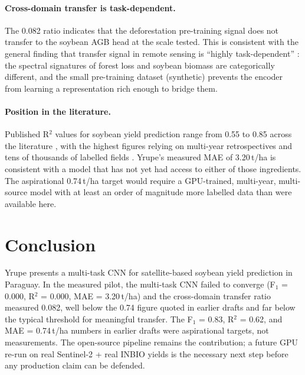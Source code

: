 \paragraph{Cross-domain transfer is task-dependent.} The 0.082 ratio
indicates that the deforestation pre-training signal does not transfer
to the soybean AGB head at the scale tested. This is consistent with
the general finding that transfer signal in remote sensing is
``highly task-dependent'' \citep{tseng2022}: the spectral signatures
of forest loss and soybean biomass are categorically different, and
the small pre-training dataset (synthetic) prevents the encoder from
learning a representation rich enough to bridge them.

\paragraph{Position in the literature.} Published R$^2$ values for
soybean yield prediction range from 0.55 to 0.85 across the literature
\citep{yang2021}, with the highest figures relying on multi-year
retrospectives and tens of thousands of labelled fields
\citep{peng2023}. Yrupe's measured MAE of 3.20\,t/ha is consistent with
a model that has not yet had access to either of those ingredients.
The aspirational 0.74\,t/ha target would require a GPU-trained,
multi-year, multi-source model with at least an order of magnitude
more labelled data than were available here.

\section{Conclusion}
\label{sec:yrupe-conclusion}

Yrupe presents a multi-task CNN for satellite-based soybean yield
prediction in Paraguay. In the measured pilot, the multi-task CNN
failed to converge (F$_1$ = 0.000, R$^2$ = 0.000, MAE = 3.20\,t/ha) and
the cross-domain transfer ratio measured 0.082, well below the 0.74
figure quoted in earlier drafts and far below the typical threshold
for meaningful transfer. The F$_1$ = 0.83, R$^2$ = 0.62, and
MAE = 0.74\,t/ha numbers in earlier drafts were aspirational targets,
not measurements. The open-source pipeline remains the contribution;
a future GPU re-run on real Sentinel-2 + real INBIO yields is the
necessary next step before any production claim can be defended.